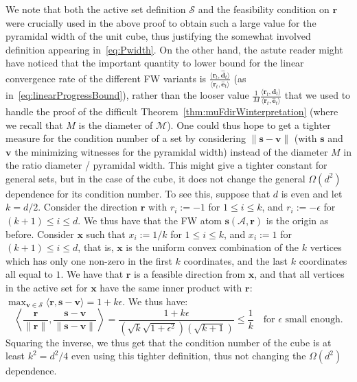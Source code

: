 \documentclass{article} %
\newcommand{\domain}{\mathcal{M}} %
\newcommand{\x}{\bm{x}}
\newcommand{\s}{\bm{s}}
\newcommand{\dd}{\bm{d}}
\newcommand{\vv}{\bm{v}} %
\newcommand{\Vertices}{\mathcal{A}} %
\renewcommand{\S}{\mathcal{S}}
\renewcommand{\r}{\bm{r}}
\newcommand{\innerProd}[2]{\left\langle #1 , #2 \right\rangle}
\newcommand{\innerProdCompressed}[2]{\langle #1 , #2 \rangle}
\newcommand{\err}{\bm{e}} %
\newcommand{\0}{\mathbf{0}} %
\begin{document}
We note that both the active set definition $\S$ and the feasibility condition on $\r$
were crucially used in the above proof to obtain such a large value
for the pyramidal width of the unit cube, thus justifying the somewhat
involved definition appearing in~\eqref{eq:Pwidth}. On the other hand, 
the astute reader might have noticed that the important quantity to lower
bound for the linear convergence rate of the different FW variants is
$\frac{\innerProdCompressed{\r_t}{\hat{\dd}_t}}{\innerProdCompressed{\r_t}{\hat{\err}_t}}$
(as in~\eqref{eq:linearProgressBound}),
rather than the looser value $\frac{1}{M} \frac{\innerProdCompressed{\r_t}{\dd_t}}{\innerProdCompressed{\r_t}{\hat{\err}_t}}$ 
that we used to handle the proof of the difficult Theorem~\ref{thm:muFdirWinterpretation}
(where we recall that $M$ is the diameter of $\domain$).
One could thus hope to get a tighter measure for the condition number of a set
by considering $\|\s -\vv\|$ (with $\s$ and $\vv$ the minimizing witnesses for
the pyramidal width) instead of the diameter $M$ in the ratio diameter / pyramidal width.
This might give a tighter constant for general sets, but in the case of the cube, it does not
change the general $\Omega(d^2)$ dependence for its condition number. To see this, suppose that $d$ is
even and let $k = d/2$. Consider the direction $\r$ with $r_i := -1$ for $1 \leq i \leq k$, and $r_i := -\epsilon$ for $(k\!+\!1) \leq i \leq d$. We thus have that the FW atom $\s(\Vertices,\r)$
is the origin as before. Consider $\x$ such that $x_i := 1/k$ for $1 \leq i \leq k$, 
and $x_i := 1$ for $(k\!+\!1) \leq i \leq d$, that is, $\x$ is the uniform convex combination
of the $k$ vertices which has only one non-zero in the first $k$ coordinates, and the last $k$
coordinates all equal to $1$. We have that $\r$ is a feasible direction from $\x$, and
that all vertices in the active set for $\x$ have the same inner product with $\r$:
$\max_{\vv \in \S} \innerProdCompressed{\r}{\s-\vv} = 1 + k \epsilon$. We thus have:
$$
\innerProd{\frac{\r}{\|\r\|}}{\frac{\s - \vv}{\|\s - \vv\|}} = \frac{1 + k \epsilon}{(\sqrt{k}\sqrt{1 + \epsilon^2}) (\sqrt{k+1})} \leq \frac{1}{k} \quad \text{for $\epsilon$ small enough}.
$$
Squaring the inverse, we thus get that the condition number of the cube is at least $k^2 = d^2/4$
even using this tighter definition, thus not changing the $\Omega(d^2)$ dependence.
\end{document}
